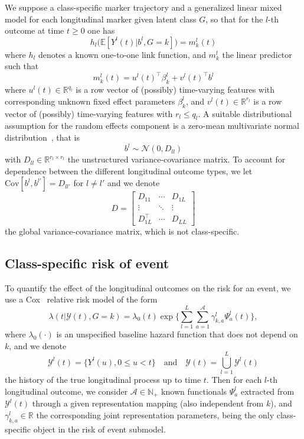\documentclass[11pt]{article}
\newcommand{\cY}{\mathcal Y}
\newcommand{\cN}{\mathcal N}
\newcommand{\cA}{\mathcal A}
\newcommand{\R}{\mathds R}
\newcommand{\N}{\mathds N}
\newcommand{\E}{\mathds E}
\begin{document}
We suppose a class-specific marker trajectory and a generalized linear mixed model for each longitudinal marker given latent class $G$, so that for the $l$-th outcome at time $t \geq 0$ one has
\begin{equation}
  \label{eq:link-function}
  h_l\big(\E[Y^l(t)|b^l, G=k]\big) = m_k^l(t)
 \end{equation}
where $h_l$ denotes a known one-to-one link function, and $m_k^l$ the linear predictor such that
\[ m_k^l(t) = u^l(t)^\top\beta_k^l + v^l(t)^\top b^l \]
where $u^l(t) \in \R^{q_l}$ is a row vector of (possibly) time-varying features with corresponding unknown fixed effect parameters $\beta_k^l$, and $v^l(t) \in \R^{r_l}$ is a row vector of (possibly) time-varying features with $r_l \leq q_l$.
A suitable distributional assumption for the random effects component is a zero-mean multivariate normal distribution~\citep{hickey2016joint}, that is
\begin{equation}
   \label{eq:random-effect-law}
   b^l \sim \cN(0, D_{ll})
 \end{equation} 
with $D_{ll} \in \R^{r_l \times r_l}$ the unstructured variance-covariance matrix. 
To account for dependence between the different longitudinal outcome types, we let $\text{Cov}[b^l,b^{l'}] = D_{ll'}$ for $l \ne l'$ and we denote
\[ D = 
\begin{bmatrix}
  D_{11} & \cdots & D_{1L}\\
  \vdots &  \ddots & \vdots \\
  D_{1L}^\top & \cdots & D_{LL}
\end{bmatrix}
\]
the global variance-covariance matrix, which is not class-specific.

\subsection{Class-specific risk of event}

To quantify the effect of the longitudinal outcomes on the risk for an event, we use a Cox~\citep{Cox1972JRSS} relative risk model of the form
\begin{equation}
  \label{eq:intensity-model}
  \lambda(t|\cY(t), G = k) = \lambda_0(t) \exp \Big\{\sum_{l=1}^L \sum_{a=1}^\cA {\gamma_{k,a}^l} \Psi_a^l(t) \Big\},
\end{equation}
where $\lambda_0(\cdot)$ is an unspecified baseline hazard function that does not depend on $k$, and we denote 
\[\cY^l(t) = \{Y^l(u), 0 \leq u < t\} \quad \text{and} \quad \cY(t) = \bigcup_{l=1}^L \cY^l(t)\] 
the history of the true longitudinal process up to time $t$.
Then for each $l$-th longitudinal outcome, we consider $\cA \in \N_+$ known functionals $\Psi_a^l$ extracted from $\cY^l(t)$ through a given representation mapping (also independent from $k$), and $\gamma_{k,a}^l \in \R$ the corresponding joint representation parameters, being the only class-specific object in the risk of event submodel.
\end{document}
